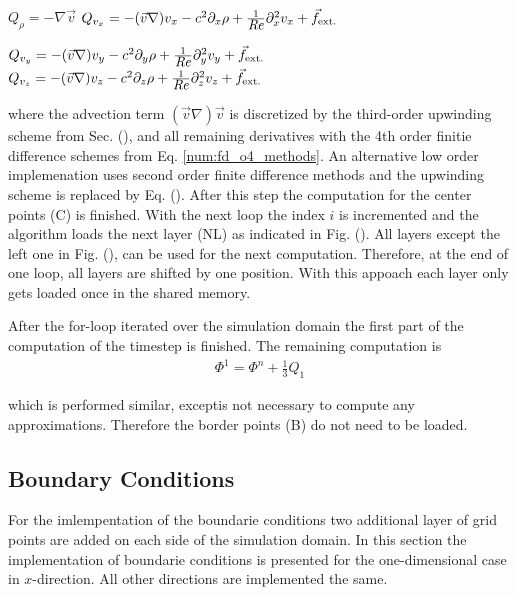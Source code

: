 \begin{algorithmic}
      \STATE ${Q_{\rho} = -\nabla \vec{v}}$
\ENDIF
{}
      \STATE ${Q_{v_x} = -(\vec{v} \nabla) v_x - c^2\partial_x\rho + \frac{1}{\mbox{\textit{Re}}}\partial^2_xv_x + \vec{f}_{\text{ext.}}}$
\ENDIF
\end{algorithmic}
\clearpage

\begin{algorithmic}
      \STATE ${Q_{v_y} = -(\vec{v} \nabla) v_y - c^2\partial_y\rho + \frac{1}{\mbox{\textit{Re}}}\partial^2_yv_y + \vec{f}_{\text{ext.}}}$
\ENDIF
{}
      \STATE ${Q_{v_z} = -(\vec{v} \nabla) v_z - c^2\partial_z\rho + \frac{1}{\mbox{\textit{Re}}}\partial^2_zv_z + \vec{f}_{\text{ext.}}}$
\ENDIF
\end{algorithmic}

where the advection term $(\vec{v}\nabla)\vec{v}$ is discretized by the third-order upwinding scheme from Sec. (),
and all remaining derivatives with the 4th order finitie difference schemes from Eq. \ref{num:fd_o4_methods}.
An alternative low order implemenation uses second order finite difference methods and the upwinding scheme is replaced by Eq. ().
After this step the computation for the center points (C) is finished.
With the next loop the index $i$ is incremented and the algorithm loads the next layer (NL) as indicated in Fig. ().
All layers except the left one in Fig. (), can be used for the next computation.
Therefore, at the end of one loop, all layers are shifted by one position.
With this appoach each layer only gets loaded once in the shared memory.

After the for-loop iterated over the simulation domain the first part of the computation of the timestep is finished.
The remaining computation is
\begin{align}
     \Phi^{1} = \Phi^n + \frac{1}{3}Q_1
\end{align}

which is performed similar, exceptis not necessary to compute any approximations.
Therefore the border points (B) do not need to be loaded.

\subsection{Boundary Conditions}

For the imlempentation of the boundarie conditions two additional layer of grid points
are added on each side of the simulation domain.
In this section the implementation of boundarie conditions is presented for the one-dimensional case in $x$-direction.
All other directions are implemented the same.

